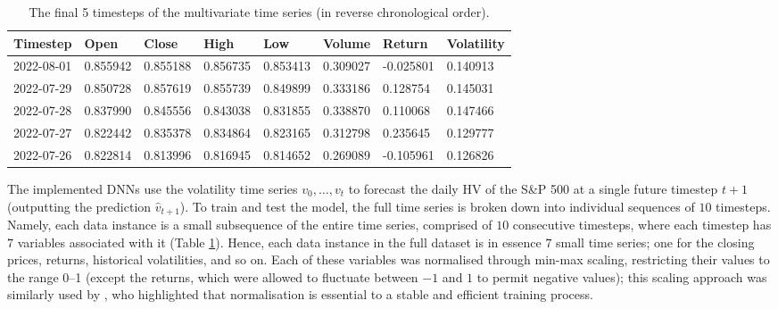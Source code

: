 \documentclass[a4paper, 11pt]{report}
\begin{document}
    \begin{table}[ht]
        \centering
        \begin{tabular}{|l|lllllll|} 
            \hline
            \textbf{Timestep} & \textbf{Open} & \textbf{Close} & \textbf{High} & \textbf{Low} & \textbf{Volume} & \textbf{Return} & \textbf{Volatility}  \\ 
            \hline
            2022-08-01 & 0.855942 & 0.855188 & 0.856735 & 0.853413 & 0.309027 & -0.025801 & 0.140913    \\ 
            \hline
            2022-07-29 & 0.850728 & 0.857619 & 0.855739 & 0.849899 & 0.333186 & 0.128754  & 0.145031    \\ 
            \hline
            2022-07-28 & 0.837990 & 0.845556 & 0.843038 & 0.831855 & 0.338870 & 0.110068  & 0.147466    \\ 
            \hline
            2022-07-27 & 0.822442 & 0.835378 & 0.834864 & 0.823165 & 0.312798 & 0.235645  & 0.129777    \\ 
            \hline
            2022-07-26 & 0.822814 & 0.813996 & 0.816945 & 0.814652 & 0.269089 & -0.105961 & 0.126826    \\
            \hline
        \end{tabular}

        \caption{\centering The final 5 timesteps of the multivariate time series (in reverse chronological order).}
        \label{table: time-series}
    \end{table}


    The implemented DNNs use the volatility time series $v_0, \ldots, v_t$ to forecast the daily HV of the S\&P 500 at a single future timestep $t+1$ (outputting the prediction $\hat{v}_{t+1}$). To train and test the model, the full time series is broken down into individual sequences of $10$ timesteps. Namely, each data instance is a small subsequence of the entire time series, comprised of $10$ consecutive timesteps, where each timestep has $7$ variables associated with it (Table \ref{table: time-series}). Hence, each data instance in the full dataset is in essence $7$ small time series; one for the closing prices, returns, historical volatilities, and so on. Each of these variables was normalised through min-max scaling, restricting their values to the range 0--1 (except the returns, which were allowed to fluctuate between $-1$ and $1$ to permit negative values); this scaling approach was similarly used by \citet{rodikov-2022}, who highlighted that normalisation is essential to a stable and efficient training process.
\end{document}
